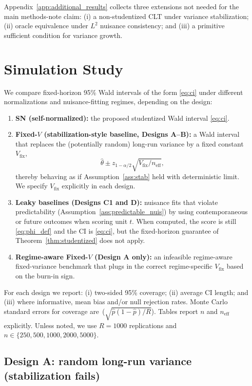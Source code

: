 \documentclass[11pt]{article}
\numberwithin{equation}{section}
\newcommand{\mcse}[1]{{\footnotesize\,(#1)}}
\theoremstyle{plain}
\theoremstyle{definition}
\theoremstyle{remark}
\begin{document}
Appendix~\ref{app:additional_results} collects three extensions not needed for the main methods-note claim:
(i) a non-studentized CLT under variance stabilization;
(ii) oracle equivalence under $L^2$ nuisance consistency; and
(iii) a primitive sufficient condition for variance growth.


\section{Simulation Study}\label{sec:simulation}
\normalsize

We compare fixed-horizon 95\% Wald intervals of the form \eqref{eq:ci} under different normalizations and nuisance-fitting regimes, depending on the design:
\begin{enumerate}[leftmargin=2em,label=(CI\arabic*)]
\item \textbf{SN (self-normalized):} the proposed studentized Wald interval \eqref{eq:ci}.
\item \textbf{Fixed-$V$ (stabilization-style baseline, Designs A--B):} a Wald interval that replaces the (potentially random) long-run variance by a fixed constant $V_{\mathrm{fix}}$,
\[
\widehat\theta \pm z_{1-\alpha/2}\sqrt{V_{\mathrm{fix}}/n_{\mathrm{eff}}},
\]
thereby behaving as if Assumption~\ref{ass:stab} held with deterministic limit. We specify $V_{\mathrm{fix}}$ explicitly in each design.
\item \textbf{Leaky baselines (Designs C1 and D):} nuisance fits that violate predictability (Assumption~\ref{ass:predictable_nuis}) by using contemporaneous or future outcomes when scoring unit $t$. When computed, the score is still \eqref{eq:phi_def} and the CI is \eqref{eq:ci}, but the fixed-horizon guarantee of Theorem~\ref{thm:studentized} does not apply.
\item \textbf{Regime-aware Fixed-$V$ (Design A only):} an infeasible regime-aware fixed-variance benchmark that plugs in the correct regime-specific $V_{\mathrm{fix}}$ based on the burn-in sign.
\end{enumerate}

For each design we report: (i) two-sided 95\% coverage; (ii) average CI length; and (iii) where informative, mean bias and/or null rejection rates. Monte Carlo standard errors for coverage are \mcse{$\sqrt{\hat p(1-\hat p)/R}$}. Tables report $n$ and $n_{\mathrm{eff}}$ explicitly. Unless noted, we use $R=1000$ replications and $n\in\{250,500,1000,2000,5000\}$.

\subsection{Design A: random long-run variance (stabilization fails)}\label{sec:sim_A}
\end{document}
